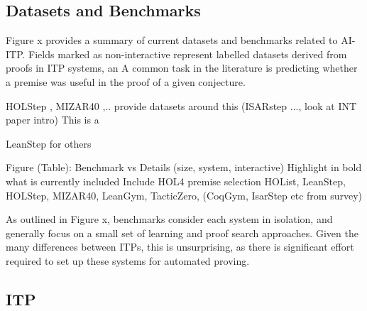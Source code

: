 \documentclass[letterpaper]{article} %
\begin{document}
    \subsection{Datasets and Benchmarks}

    Figure x provides a summary of current datasets and benchmarks related to AI-ITP.
    Fields marked as non-interactive represent labelled datasets derived from proofs in ITP systems, an
    A common task in the literature is predicting whether a premise was useful in the proof of a given conjecture.

    HOLStep \cite{kaliszyk_holstep_2017}, MIZAR40 \cite{kaliszyk_mizar_2015},.. provide datasets around this (ISARstep ..., look at INT paper intro)
    This is a


    LeanStep for others

    Figure (Table):
    Benchmark vs Details (size, system, interactive)
    Highlight in bold what is currently included
    Include HOL4 premise selection
    HOList, LeanStep, HOLStep, MIZAR40, LeanGym, TacticZero, (CoqGym, IsarStep etc from survey)

    As outlined in Figure x, benchmarks consider each system in isolation, and generally focus on a small set of
    learning and proof search approaches.
    Given the many differences between ITPs, this is unsurprising, as there is significant effort required to set
    up these systems for automated proving.

%
%
    \subsection{ITP}
\end{document}
